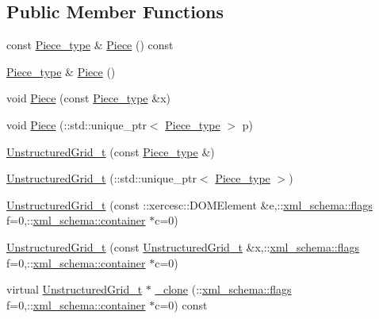 \subsection*{Public Member Functions}
\begin{DoxyCompactItemize}
\item 
const \hyperlink{classUnstructuredGrid__t_a559913611314b34f4868027fc91e35bc}{Piece\+\_\+type} \& \hyperlink{classUnstructuredGrid__t_a32fdd47d79cfdd2eb071cf674b7cc9ee}{Piece} () const 
\item 
\hyperlink{classUnstructuredGrid__t_a559913611314b34f4868027fc91e35bc}{Piece\+\_\+type} \& \hyperlink{classUnstructuredGrid__t_a66b7c6fc204fdc78b4611fd132771573}{Piece} ()
\item 
void \hyperlink{classUnstructuredGrid__t_a97ef3f79738631a4265c4fbeb170f04d}{Piece} (const \hyperlink{classUnstructuredGrid__t_a559913611314b34f4868027fc91e35bc}{Piece\+\_\+type} \&x)
\item 
void \hyperlink{classUnstructuredGrid__t_ab6746290ddee77043f5830b05d750972}{Piece} (\+::std\+::unique\+\_\+ptr$<$ \hyperlink{classUnstructuredGrid__t_a559913611314b34f4868027fc91e35bc}{Piece\+\_\+type} $>$ p)
\item 
\hyperlink{classUnstructuredGrid__t_a00bf6957ea7e3313e2890bd4c02f8981}{Unstructured\+Grid\+\_\+t} (const \hyperlink{classUnstructuredGrid__t_a559913611314b34f4868027fc91e35bc}{Piece\+\_\+type} \&)
\item 
\hyperlink{classUnstructuredGrid__t_a5335359377e3026191868e93675a5436}{Unstructured\+Grid\+\_\+t} (\+::std\+::unique\+\_\+ptr$<$ \hyperlink{classUnstructuredGrid__t_a559913611314b34f4868027fc91e35bc}{Piece\+\_\+type} $>$)
\item 
\hyperlink{classUnstructuredGrid__t_ad6fb3d97ad8d9443d53e1152a9fa6004}{Unstructured\+Grid\+\_\+t} (const \+::xercesc\+::\+D\+O\+M\+Element \&e,\+::\hyperlink{namespacexml__schema_a0612287d030cb2732d31a45b258fdc87}{xml\+\_\+schema\+::flags} f=0,\+::\hyperlink{namespacexml__schema_ada9aa30dc722e93ee2ed7243085402a5}{xml\+\_\+schema\+::container} $\ast$c=0)
\item 
\hyperlink{classUnstructuredGrid__t_a893b6debad8369f36a3cdc2aaa22b478}{Unstructured\+Grid\+\_\+t} (const \hyperlink{classUnstructuredGrid__t}{Unstructured\+Grid\+\_\+t} \&x,\+::\hyperlink{namespacexml__schema_a0612287d030cb2732d31a45b258fdc87}{xml\+\_\+schema\+::flags} f=0,\+::\hyperlink{namespacexml__schema_ada9aa30dc722e93ee2ed7243085402a5}{xml\+\_\+schema\+::container} $\ast$c=0)
\item 
virtual \hyperlink{classUnstructuredGrid__t}{Unstructured\+Grid\+\_\+t} $\ast$ \hyperlink{classUnstructuredGrid__t_ae51f374b8650e990f30723bdcf181f2d}{\+\_\+clone} (\+::\hyperlink{namespacexml__schema_a0612287d030cb2732d31a45b258fdc87}{xml\+\_\+schema\+::flags} f=0,\+::\hyperlink{namespacexml__schema_ada9aa30dc722e93ee2ed7243085402a5}{xml\+\_\+schema\+::container} $\ast$c=0) const 

\end{DoxyCompactItemize}
